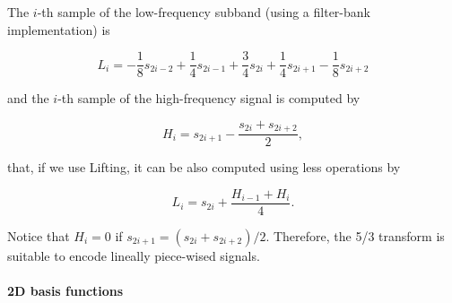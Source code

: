 The \(i\)-th sample of the low-frequency subband (using a filter-bank
implementation) is

\begin{equation}
  L_i=-\frac{1}{8}s_{2i-2}+\frac{1}{4}s_{2i-1}+\frac{3}{4}s_{2i}
  +\frac{1}{4}s_{2i+1}-\frac{1}{8}s_{2i+2}
  \tag{5/3L}
  \label{eq:Lineal_A-LPF}
\end{equation}

and the \(i\)-th sample of the high-frequency signal is computed by

\begin{equation}
  H_i=s_{2i+1}-\frac{s_{2i}+s_{2i+2}}{2},
  \tag{5/3H}
  \label{eq:Lineal_A-HPF}
\end{equation}

that, if we use Lifting, it can be also computed using less operations
by

\begin{equation}
  L_i=s_{2i}+\frac{H_{i-1}+H_i}{4}.
  \tag{5/3LLifted}
  \label{eq:Lineal_A-LPF_lifting}
\end{equation}

Notice that \(H_i=0\) if \(s_{2i+1}=(s_{2i}+s_{2i+2})/2\). Therefore,
the 5/3 transform is suitable to encode lineally piece-wised signals.

    \hypertarget{d-basis-functions}{%
\paragraph{2D basis functions}\label{d-basis-functions}}

